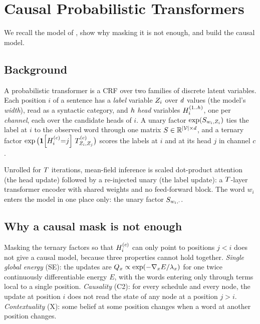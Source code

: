 \section{Causal Probabilistic Transformers}
\label{sec:model}

We recall the model of \citet{wu2023probabilistic}, show why masking it is not enough, and build
the causal model.

\subsection{Background}
\label{sec:recap}

A probabilistic transformer is a CRF over two families of discrete latent variables. Each
position $i$ of a sentence has a \emph{label} variable $Z_{i}$ over $d$ values (the
model's \emph{width}), read as a syntactic category, and $h$ \emph{head} variables $H_{i}^{(1..h)}$, one per
\emph{channel}, each over the candidate heads of $i$. A unary factor
$\exp(S_{w_i, Z_{i}})$ ties the label at $i$ to the observed word through one matrix
$S \in \mathbb{R}^{|\mathcal{V}| \times d}$, and a ternary factor
$\exp\big(\mathbf{1}\!\left[H_{i}^{(c)}{=}j\right]\, T^{(c)}_{Z_{i},Z_{j}}\big)$ scores the labels at $i$ and at
its head $j$ in channel $c$.

Unrolled for $T$ iterations, mean-field inference is scaled dot-product attention (the head
update) followed by a re-injected unary (the label update): a $T$-layer transformer encoder
with shared weights and no feed-forward block. The word $w_i$ enters the model in one place
only: the unary factor $S_{w_i,\cdot}$.

\subsection{Why a causal mask is not enough}
\label{sec:obstruction}

Masking the ternary factors so that $H_{i}^{(c)}$ can only point to positions $j < i$ does not
give a causal model, because three properties cannot hold together. \emph{Single global energy}
(SE): the updates are $Q_x \propto \exp(-\nabla_x E / \lambda_x)$ for one twice continuously
differentiable energy $E$, with the
words entering only through terms local to a single position. \emph{Causality} (C2): for every
schedule and every node, the update at position $i$ does not read the state of any node at a
position $j > i$. \emph{Contextuality} (X): some belief at some position changes when a word at
another position changes.

